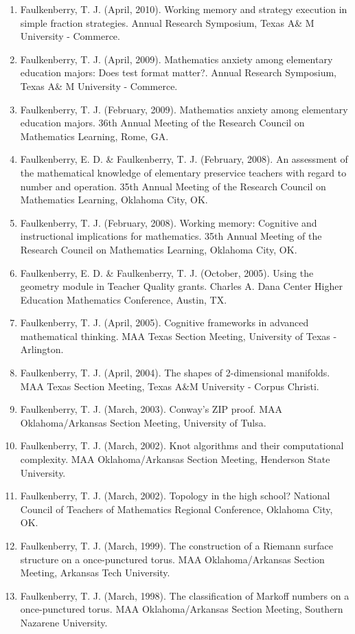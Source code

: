 \documentclass[article,10pt]{article}
\begin{document}
\begin{enumerate}
\item Faulkenberry, T. J. (April, 2010). Working memory and strategy execution in simple fraction strategies. Annual Research Symposium, Texas A\& M University - Commerce.
\item Faulkenberry, T. J. (April, 2009). Mathematics anxiety among elementary education majors: Does test format matter?. Annual Research Symposium, Texas A\& M University - Commerce.
\item Faulkenberry, T. J. (February, 2009). Mathematics anxiety among elementary education majors. 36th Annual Meeting of the Research Council on Mathematics Learning, Rome, GA.
\item Faulkenberry, E. D. \& Faulkenberry, T. J. (February, 2008). An assessment of the mathematical knowledge of elementary preservice teachers with regard to number and operation. 35th Annual Meeting of the Research Council on Mathematics Learning, Oklahoma City, OK.
\item Faulkenberry, T. J. (February, 2008). Working memory: Cognitive and instructional implications for mathematics. 35th Annual Meeting of the Research Council on Mathematics Learning, Oklahoma City, OK.
\item Faulkenberry, E. D. \& Faulkenberry, T. J. (October, 2005). Using the geometry module in Teacher Quality grants. Charles A. Dana Center Higher Education Mathematics Conference, Austin, TX.
\item Faulkenberry, T. J. (April, 2005). Cognitive frameworks in advanced mathematical thinking. MAA Texas Section Meeting, University of Texas - Arlington.
\item Faulkenberry, T. J. (April, 2004). The shapes of 2-dimensional manifolds. MAA Texas Section Meeting, Texas A\&M University - Corpus Christi.
\item Faulkenberry, T. J. (March, 2003). Conway’s ZIP proof. MAA Oklahoma/Arkansas Section Meeting, University of Tulsa.
\item Faulkenberry, T. J. (March, 2002). Knot algorithms and their computational complexity. MAA Oklahoma/Arkansas Section Meeting, Henderson State University.
\item Faulkenberry, T. J. (March, 2002). Topology in the high school? National Council of Teachers of Mathematics Regional Conference, Oklahoma City, OK.
\item Faulkenberry, T. J. (March, 1999). The construction of a Riemann surface structure on a once-punctured torus. MAA Oklahoma/Arkansas Section Meeting, Arkansas Tech University.
\item Faulkenberry, T. J. (March, 1998). The classification of Markoff numbers on a once-punctured torus. MAA Oklahoma/Arkansas Section Meeting, Southern Nazarene University.
\end{enumerate}
\end{document}
